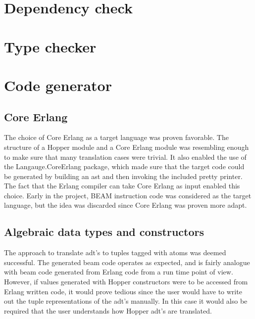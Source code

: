 \section{Dependency check}

\section{Type checker}

\section{Code generator}


\subsection{Core Erlang}

The choice of Core Erlang as a target language was proven favorable. The structure of a Hopper module and a Core Erlang module was resembling enough to make sure that many translation cases were trivial. It also enabled the use of the Langauge.CoreErlang \cite{CoreErlang} package, which made sure that the target code could be generated by building an \acrshort{ast} and then invoking the included pretty printer. The fact that the Erlang compiler can take Core Erlang as input enabled this choice. Early in the project, BEAM instruction code was considered as the target language, but the idea was discarded since Core Erlang was proven more adapt.

\subsection{Algebraic data types and constructors}

The approach to translate \acrshort{adt}'s to tuples tagged with atoms was deemed successful. The generated beam code operates as expected, and is fairly analogue with beam code generated from Erlang code from a run time point of view. However, if values generated with Hopper constructors were to be accessed from Erlang written code, it would prove tedious since the user would have to write out the tuple representations of the \acrshort{adt}'s manually. In this case it would also be required that the user understands how Hopper \acrshort{adt}'s are translated.

